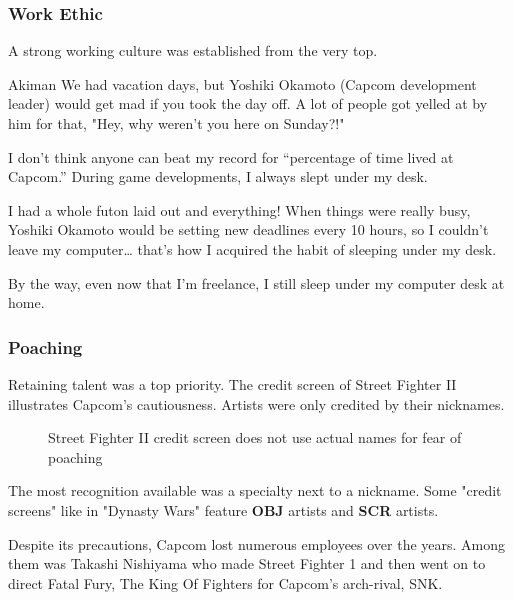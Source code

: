 \subsubsection{Work Ethic}

A strong working culture was established from the very top.

\begin{q}{Akiman\cite{akiman2003}}
  We had vacation days, but Yoshiki Okamoto (Capcom development leader) would get mad if you took the day off. A lot of people got yelled at by him for that, "Hey, why weren't you here on Sunday?!"

  I don't think anyone can beat my record for “percentage of time lived at Capcom.” During game developments, I always slept under my desk. 

  I had a whole futon laid out and everything! When things were really busy, Yoshiki Okamoto  would be setting new deadlines every 10 hours, so I couldn't leave my computer… that's how I acquired the habit of sleeping under my desk. 

  By the way, even now that I'm freelance, I still sleep under my computer desk at home.
  \end{q}

\subsubsection{Poaching}


Retaining talent was a top priority. The credit screen of Street Fighter II illustrates Capcom's cautiousness. Artists were only credited by their nicknames.

 \begin{figure}[H]
\caption*{Street Fighter II credit screen does not use actual names for fear of poaching}
\end{figure}

\begin{trivia}
The most recognition available was a specialty next to a nickname. Some "credit screens" like in "Dynasty Wars" feature \textbf{OBJ} artists and \textbf{SCR} artists.
\end{trivia}


Despite its precautions, Capcom lost numerous employees over the years. Among them was Takashi Nishiyama who made Street Fighter 1 and then went on to direct Fatal Fury, The King Of Fighters for Capcom's arch-rival, SNK\cite{YoshikiOkamotoTakashiNishiyama}.
 










